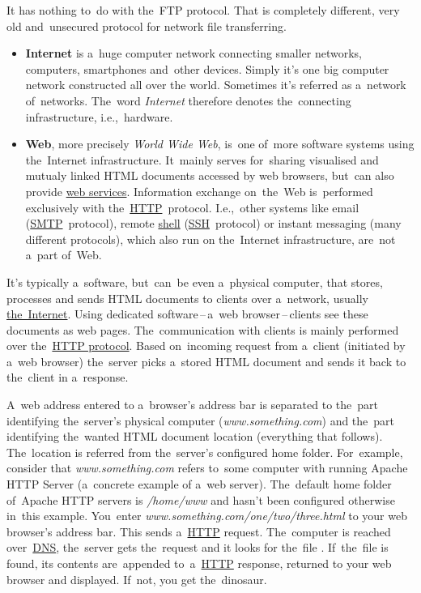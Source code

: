 \warning It has nothing to~do with the~FTP protocol.
That is completely different, very old and~unsecured protocol for network file transferring.

\label{internetweb}
\begin{itemize}
    \item \textbf{Internet} is a~huge computer network connecting smaller networks, computers, smartphones and~other devices.
          Simply it's one big computer network constructed all over the world.
          Sometimes it's referred as a~network of~networks.
          The~word \textit{Internet} therefore denotes the~connecting infrastructure, i.e.,~hardware.
    \item \textbf{Web}, more precisely \textit{World Wide Web}, is~one of~more software systems using the~Internet infrastructure.
          It~mainly serves for~sharing visualised and mutualy linked HTML documents accessed by web browsers, but~can also provide \hyperref[webserviceapplication]{web services}.
          Information exchange on~the~Web is~performed exclusively with the~\hyperref[http]{HTTP}~protocol.
          I.e.,~other systems like email (\hyperref[smtp]{SMTP}~protocol), remote \hyperref[shellcligui]{shell} (\hyperref[ssh]{SSH}~protocol) or instant messaging (many different protocols), which also run on the~Internet infrastructure, are~not a~part of~Web.
\end{itemize}

\label{namespaces}

\label{webserver}
It's typically a~software, but~can~be even a~physical computer, that stores, processes and sends HTML documents to clients over a~network, usually \hyperref[internetweb]{the~Internet}.
Using dedicated software\,--\,a~web browser\,--\,clients see these documents as web pages.
The~communication with clients is mainly performed over the~\hyperref[http]{HTTP protocol}.
Based on~incoming request from a~client (initiated by a~web browser) the~server picks a~stored HTML document and sends it back to the~client in a~response.

A~web address entered to a~browser's address bar is separated to the~part identifying the~server's physical computer (\textit{www.something.com}) and the~part identifying the~wanted HTML document location (everything that follows).
The~location is referred from the~server's configured home folder.
For~example, consider that \textit{www.something.com} refers to~some computer with running Apache HTTP Server (a~concrete example of a~web server).
The~default home folder of~Apache HTTP servers is \textit{/home/www} and hasn't been configured otherwise in~this example.
You~enter \textit{www.something.com/one/two/three.html} to your web browser's address bar.
This sends a~\hyperref[http]{HTTP} request.
The~computer is reached over~\hyperref[dns]{DNS}, the~server gets the~request and it looks for the~file .
If~the~file is found, its contents are~appended to~a~\hyperref[http]{HTTP} response, returned to your web browser and displayed.
If~not, you get the~dinosaur.


